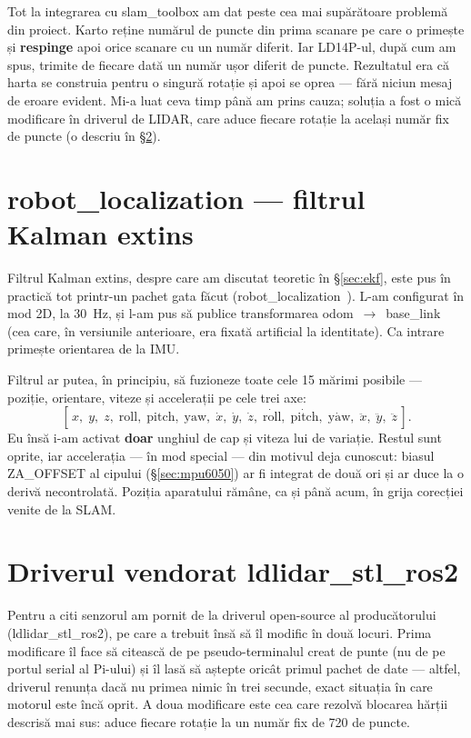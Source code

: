 \documentclass[a4paper,12pt,twoside,openany]{report}
\renewcommand{\texttt}[1]{\textnormal{#1}}
\begin{document}
Tot la integrarea cu slam\_toolbox am dat peste cea mai supărătoare problemă
din proiect. Karto reține numărul de puncte din prima scanare pe care o
primește și \textbf{respinge} apoi orice scanare cu un număr diferit. Iar
LD14P-ul, după cum am spus, trimite de fiecare dată un număr ușor diferit de
puncte. Rezultatul era că harta se construia pentru o singură rotație și apoi
se oprea — fără niciun mesaj de eroare evident. Mi-a luat ceva timp până am
prins cauza; soluția a fost o mică modificare în driverul de LIDAR, care aduce
fiecare rotație la același număr fix de puncte (o descriu în
§\ref{sec:ldlidar-driver}).

\section{robot\_localization — filtrul Kalman extins}
\label{sec:ekf-node}

Filtrul Kalman extins, despre care am discutat teoretic în §\ref{sec:ekf},
este pus în practică tot printr-un pachet gata făcut
(robot\_localization~\cite{moore2014robotlocalization}). L-am configurat în mod
2D, la \SI{30}{\hertz}, și l-am pus să publice transformarea
\texttt{odom}~$\to$~\texttt{base\_link} (cea care, în versiunile anterioare,
era fixată artificial la identitate). Ca intrare primește orientarea de la
IMU.

Filtrul ar putea, în principiu, să fuzioneze toate cele 15 mărimi posibile —
poziție, orientare, viteze și accelerații pe cele trei axe:
\[
[\,x,\; y,\; z,\; \mathrm{roll},\; \mathrm{pitch},\; \mathrm{yaw},\;
\dot{x},\; \dot{y},\; \dot{z},\; \dot{\mathrm{roll}},\; \dot{\mathrm{pitch}},\;
\dot{\mathrm{yaw}},\; \ddot{x},\; \ddot{y},\; \ddot{z}\,].
\]
Eu însă i-am activat \textbf{doar} unghiul de cap și viteza lui de variație.
Restul sunt oprite, iar accelerația — în mod special — din motivul deja
cunoscut: biasul \texttt{ZA\_OFFSET} al cipului (§\ref{sec:mpu6050}) ar fi
integrat de două ori și ar duce la o derivă necontrolată. Poziția aparatului
rămâne, ca și până acum, în grija corecției venite de la SLAM.

\section{Driverul vendorat ldlidar\_stl\_ros2}
\label{sec:ldlidar-driver}

Pentru a citi senzorul am pornit de la driverul open-source al producătorului
(\texttt{ldlidar\_stl\_ros2}), pe care a trebuit însă să îl modific în două
locuri. Prima modificare îl face să citească de pe pseudo-terminalul creat de
punte (nu de pe portul serial al Pi-ului) și îl lasă să aștepte oricât primul
pachet de date — altfel, driverul renunța dacă nu primea nimic în trei secunde,
exact situația în care motorul este încă oprit. A doua modificare este cea care
rezolvă blocarea hărții descrisă mai sus: aduce fiecare rotație la un număr fix
de 720 de puncte.
\end{document}
